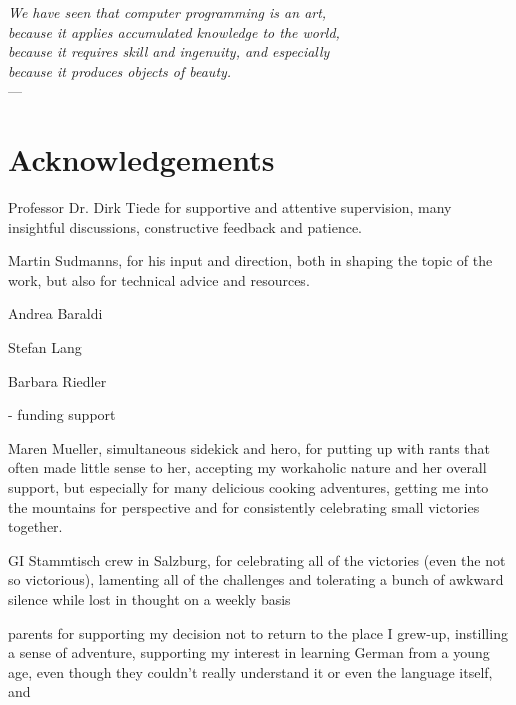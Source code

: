 \cleardoublepage
{}

\begin{flushright}{\slshape
    We have seen that computer programming is an art, \\
    because it applies accumulated knowledge to the world, \\
    because it requires skill and ingenuity, and especially \\
    because it produces objects of beauty.} \\ \medskip
    ---  \citep{knuth:1974}
\end{flushright}



\bigskip

\begingroup
\let\clearpage\relax
\let\cleardoublepage\relax
\let\cleardoublepage\relax
\chapter*{Acknowledgements}
Professor Dr. Dirk Tiede for supportive and attentive supervision, many insightful discussions, constructive feedback and patience.

Martin Sudmanns, for his input and direction, both in shaping the topic of the work, but also for technical advice and resources.

Andrea Baraldi

Stefan Lang

Barbara Riedler



- funding support

Maren Mueller, simultaneous sidekick and hero, for putting up with rants that often made little sense to her, accepting my workaholic nature and her overall support, but especially for many delicious cooking adventures, getting me into the mountains for perspective and for consistently celebrating small victories together.

GI Stammtisch crew in Salzburg, for celebrating all of the victories (even the not so victorious), lamenting all of the challenges and tolerating a bunch of awkward silence while lost in thought on a weekly basis

parents for supporting my decision not to return to the place I grew-up, instilling a sense of adventure, supporting my interest in learning German from a young age, even though they couldn't really understand it or even the language itself, and

\endgroup

